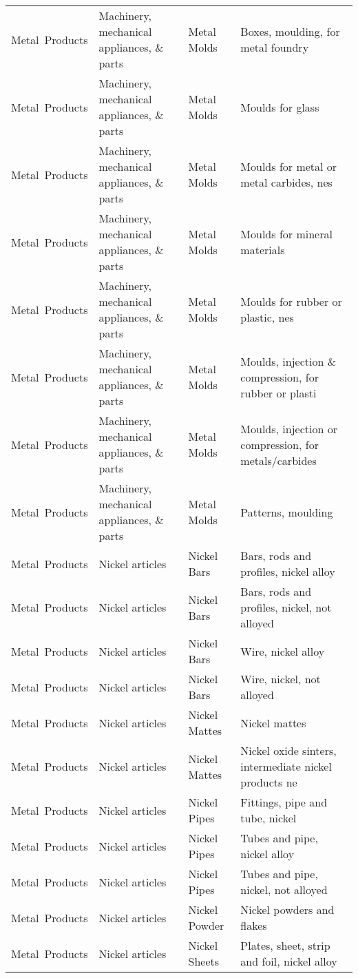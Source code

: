 \begin{appendices}
\begin{xltabular}{\textwidth}{|p{0.10\textwidth}|p{0.25\textwidth}|p{0.20\textwidth}|p{0.35\textwidth}|}
		Metal\ Products & Machinery, mechanical appliances, \& parts & Metal Molds & Boxes, moulding, for metal foundry \\
		Metal\ Products & Machinery, mechanical appliances, \& parts & Metal Molds & Moulds for glass \\
		Metal\ Products & Machinery, mechanical appliances, \& parts & Metal Molds & Moulds for metal or metal carbides, nes \\
		Metal\ Products & Machinery, mechanical appliances, \& parts & Metal Molds & Moulds for mineral materials \\
		Metal\ Products & Machinery, mechanical appliances, \& parts & Metal Molds & Moulds for rubber or plastic, nes \\
		Metal\ Products & Machinery, mechanical appliances, \& parts & Metal Molds & Moulds, injection \& compression, for rubber or plasti \\
		Metal\ Products & Machinery, mechanical appliances, \& parts & Metal Molds & Moulds, injection or compression, for metals/carbides \\
		Metal\ Products & Machinery, mechanical appliances, \& parts & Metal Molds & Patterns, moulding \\
		Metal\ Products & Nickel articles & Nickel Bars & Bars, rods and profiles, nickel alloy \\
		Metal\ Products & Nickel articles & Nickel Bars & Bars, rods and profiles, nickel, not alloyed \\
		Metal\ Products & Nickel articles & Nickel Bars & Wire, nickel alloy \\
		Metal\ Products & Nickel articles & Nickel Bars & Wire, nickel, not alloyed \\
		Metal\ Products & Nickel articles & Nickel Mattes & Nickel mattes \\
		Metal\ Products & Nickel articles & Nickel Mattes & Nickel oxide sinters, intermediate nickel products ne \\
		Metal\ Products & Nickel articles & Nickel Pipes & Fittings, pipe and tube, nickel \\
		Metal\ Products & Nickel articles & Nickel Pipes & Tubes and pipe, nickel alloy \\
		Metal\ Products & Nickel articles & Nickel Pipes & Tubes and pipe, nickel, not alloyed \\
		Metal\ Products & Nickel articles & Nickel Powder & Nickel powders and flakes \\
		Metal\ Products & Nickel articles & Nickel Sheets & Plates, sheet, strip and foil, nickel alloy \\

\end{xltabular}
\end{appendices}
